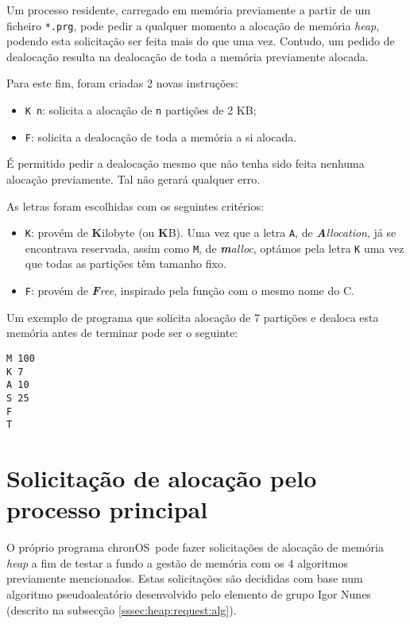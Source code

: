 \documentclass[10pt,oneside]{estiloUBI}
\newcommand{\chronOS}{\textsf{chronOS}}
\begin{document}
	Um processo residente, carregado em memória previamente a partir de um ficheiro \verb|*.prg|, pode pedir a qualquer momento a alocação de memória \textit{heap}, podendo esta solicitação ser feita mais do que uma vez. Contudo, um pedido de dealocação resulta na dealocação de toda a memória previamente alocada.
	
	Para este fim, foram criadas 2 novas instruções:
	
	\begin{itemize}
		\item \verb|K n|: solicita a alocação de \verb|n| partições de 2 KB;
		\item \verb|F|: solicita a dealocação de toda a memória a si alocada.
	\end{itemize}

	É permitido pedir a dealocação mesmo que não tenha sido feita nenhuma alocação previamente. Tal não gerará qualquer erro.
	
	As letras foram escolhidas com os seguintes critérios:
	
	\begin{itemize}
		\item \verb|K|: provém de \textbf{K}ilobyte (ou \textbf{K}B). Uma vez que a letra \verb|A|, de \textit{\textbf{A}llocation}, já se encontrava reservada, assim como \verb|M|, de \textit{\textbf{m}alloc}, optámos pela letra \verb|K| uma vez que todas as partições têm tamanho fixo.
		
		\item \verb|F|: provém de \textit{\textbf{F}ree}, inspirado pela função com o mesmo nome do C.
	\end{itemize}

	Um exemplo de programa que solicita alocação de 7 partições e dealoca esta memória antes de terminar pode ser o seguinte:
	
	\begin{verbatim}
M 100
K 7
A 10
S 25
F
T
	\end{verbatim}
	
	
	\section{Solicitação de alocação pelo processo principal}
	\label{ssec:heap:request}
	
	O próprio programa \chronOS~pode fazer solicitações de alocação de memória \textit{heap} a fim de testar a fundo a gestão de memória com os 4 algoritmos previamente mencionados. Estas solicitações são decididas com base num algoritmo pseudoaleatório desenvolvido pelo elemento de grupo Igor Nunes (descrito na subsecção \ref{sssec:heap:request:alg}).
	
\end{document}
